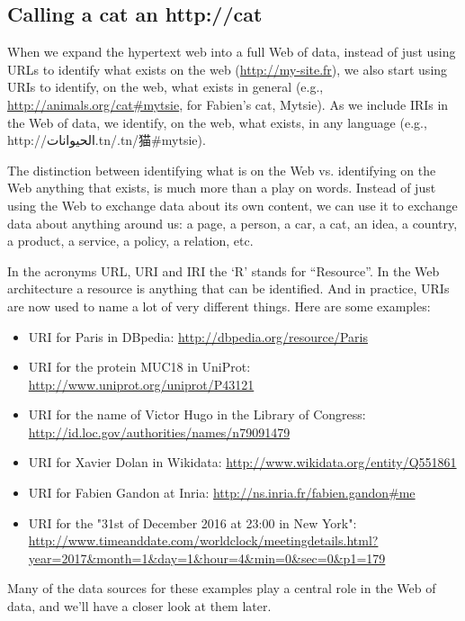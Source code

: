 \hypertarget{calling-a-cat-an-httpcat}{%
\subsection{Calling a cat an
http://cat}\label{calling-a-cat-an-httpcat}}

When we expand the hypertext web into a full Web of data, instead of just using URLs to 
identify what exists on the web (\url{http://my-site.fr}), we also start using
URIs to identify, on the web, what exists in general
(e.g., \url{http://animals.org/cat\#mytsie}, for Fabien's cat, Mytsie).  As we include IRIs in the Web of data, we identify,
on the web, what exists, in any language
(e.g., http://{\arabicfont الحيوانات.tn/}.tn/猫\#mytsie).



The distinction between identifying what is on the Web vs. identifying
on the Web anything that exists, is much more than a play on words.
Instead of just using the Web to exchange data about its own content, we
can use it to exchange data about anything around us: a page, a person,
a car, a cat, an idea, a country, a product, a service, a policy, a
relation, etc.

In the acronyms URL, URI and IRI the `R' stands for ``Resource''. In the
Web architecture a resource is anything that can be identified. And in
practice, URIs are now used to name a lot of very different things. Here
are some examples:

\begin{itemize}
\item
  URI for Paris in DBpedia: \url{http://dbpedia.org/resource/Paris}
\item
  URI for the protein MUC18 in UniProt:
  \url{http://www.uniprot.org/uniprot/P43121}
\item
  URI for the name of Victor Hugo in the Library of Congress:
  \url{http://id.loc.gov/authorities/names/n79091479}
\item
  URI for Xavier Dolan in Wikidata:
  \url{http://www.wikidata.org/entity/Q551861}
\item
  URI for Fabien Gandon at Inria:
  \url{http://ns.inria.fr/fabien.gandon\#me}
\item
  URI for the "31st of December 2016 at 23:00 in New York":
  \url{http://www.timeanddate.com/worldclock/meetingdetails.html?year=2017\&month=1\&day=1\&hour=4\&min=0\&sec=0\&p1=179}
\end{itemize}

Many of the data sources for these examples play a central role in the Web of data, and we'll 
have a closer look at them later. 

